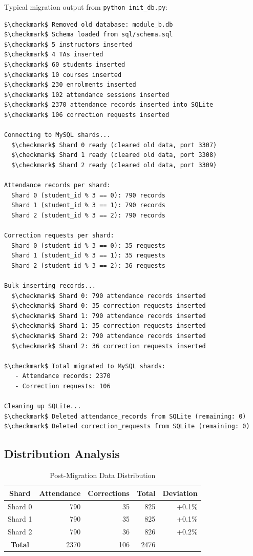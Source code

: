 \documentclass[conference]{IEEEtran}
\begin{document}
Typical migration output from \texttt{python init\_db.py}:

\begin{lstlisting}
$\checkmark$ Removed old database: module_b.db
$\checkmark$ Schema loaded from sql/schema.sql
$\checkmark$ 5 instructors inserted
$\checkmark$ 4 TAs inserted
$\checkmark$ 60 students inserted
$\checkmark$ 10 courses inserted
$\checkmark$ 230 enrolments inserted
$\checkmark$ 102 attendance sessions inserted
$\checkmark$ 2370 attendance records inserted into SQLite
$\checkmark$ 106 correction requests inserted

Connecting to MySQL shards...
  $\checkmark$ Shard 0 ready (cleared old data, port 3307)
  $\checkmark$ Shard 1 ready (cleared old data, port 3308)
  $\checkmark$ Shard 2 ready (cleared old data, port 3309)

Attendance records per shard:
  Shard 0 (student_id % 3 == 0): 790 records
  Shard 1 (student_id % 3 == 1): 790 records
  Shard 2 (student_id % 3 == 2): 790 records

Correction requests per shard:
  Shard 0 (student_id % 3 == 0): 35 requests
  Shard 1 (student_id % 3 == 1): 35 requests
  Shard 2 (student_id % 3 == 2): 36 requests

Bulk inserting records...
  $\checkmark$ Shard 0: 790 attendance records inserted
  $\checkmark$ Shard 0: 35 correction requests inserted
  $\checkmark$ Shard 1: 790 attendance records inserted
  $\checkmark$ Shard 1: 35 correction requests inserted
  $\checkmark$ Shard 2: 790 attendance records inserted
  $\checkmark$ Shard 2: 36 correction requests inserted

$\checkmark$ Total migrated to MySQL shards:
   - Attendance records: 2370
   - Correction requests: 106

Cleaning up SQLite...
$\checkmark$ Deleted attendance_records from SQLite (remaining: 0)
$\checkmark$ Deleted correction_requests from SQLite (remaining: 0)
\end{lstlisting}

\subsection{Distribution Analysis}

\begin{table}[htbp]
\caption{Post-Migration Data Distribution}
\centering
\begin{tabular}{|c|r|r|r|r|}
\hline
\textbf{Shard} & \textbf{Attendance} & \textbf{Corrections} & \textbf{Total} & \textbf{Deviation} \\
\hline
Shard 0 & 790 & 35 & 825 & +0.1\% \\
\hline
Shard 1 & 790 & 35 & 825 & +0.1\% \\
\hline
Shard 2 & 790 & 36 & 826 & +0.2\% \\
\hline
\textbf{Total} & 2370 & 106 & 2476 & \\
\hline
\end{tabular}
\label{tab:migration_distribution}
\end{table}
\end{document}
